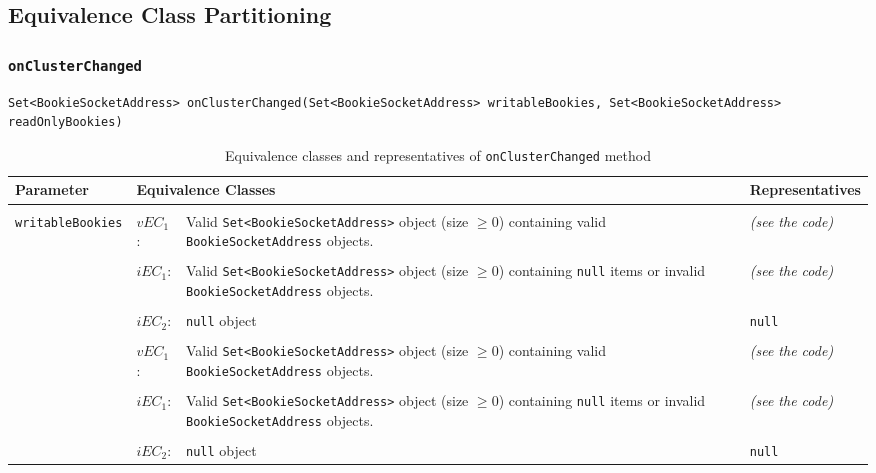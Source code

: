 \documentclass[conference, onecolumn]{IEEEtran}
\begin{document}
\subsection{Equivalence Class Partitioning}

\subsubsection{\texttt{onClusterChanged}}

\begin{lstlisting}[frame=lines, caption={\texttt{onClusterChanged} method signature.}]
Set<BookieSocketAddress> onClusterChanged(Set<BookieSocketAddress> writableBookies, Set<BookieSocketAddress> readOnlyBookies)
\end{lstlisting}




\begin{table}[h!]
  \caption{Equivalence classes and representatives of \texttt{onClusterChanged} method}
  \centering
  \begin{tabular}{llp{7cm}p{7cm}}
  
    \toprule
    \textbf{Parameter} & \multicolumn{2}{|l|}{\textbf{Equivalence Classes}} & \textbf{Representatives} \\
    \midrule
    
    \\
	\multirow{7}{*}{\texttt{writableBookies}} & $vEC_1$: & Valid \texttt{Set<BookieSocketAddress>} object (size $\geqslant 0$) containing valid \texttt{BookieSocketAddress} objects. & \textit{(see the code)} \\    
    
    \\
    & $iEC_1$: & Valid \texttt{Set<BookieSocketAddress>} object (size $\geqslant 0$) containing \texttt{null} items or invalid \texttt{BookieSocketAddress} objects. & \textit{(see the code)} \\    
    
    \\
    & $iEC_2$: & \texttt{null} object & \texttt{null} \\    
    
    \hline
    
    \\
    \multirow{7}{*}{\texttt{readOnlyBookies}} & $vEC_1$: & Valid \texttt{Set<BookieSocketAddress>} object (size $\geqslant 0$) containing valid \texttt{BookieSocketAddress} objects. & \textit{(see the code)} \\    
   
     \\
    & $iEC_1$: & Valid \texttt{Set<BookieSocketAddress>} object (size $\geqslant 0$) containing \texttt{null} items or invalid \texttt{BookieSocketAddress} objects. & \textit{(see the code)} \\    
    
    \\
    & $iEC_2$: & \texttt{null} object & \texttt{null} \\    
    
    \bottomrule
  \end{tabular}
\end{table}
\end{document}
